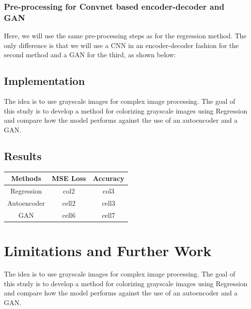 \documentclass{article}
\begin{document}
\subsubsection{Pre-processing for Convnet based encoder-decoder and GAN}
Here, we will use the same pre-processing steps as for the regression method. 
The only difference is that we will use a CNN in an encoder-decoder fashion for the second method and a GAN for the third, as shown below:

\subsection{Implementation}
The idea is to use grayscale images for complex image processing. 
The goal of this study is to develop a method for colorizing grayscale images using Regression and
compare how the model performs against the use of an autoencoder and a GAN. 

\subsection{Results}

{\Large
\begin{center}
\begin{tabular}{ |c |c|c| } 
\hline
\textbf{Methods} & \textbf{MSE Loss} & \textbf{Accuracy} \\
\hline
Regression & col2 & col3 \\
\hline
Autoencoder & cell2 & cell3  \\ 
\hline
GAN & cell6 & cell7  \\ 
\hline
\end{tabular}
\end{center}
}

\section{Limitations and Further Work}
The idea is to use grayscale images for complex image processing. The goal of this
study is to develop a method for colorizing grayscale images using Regression and
compare how the model performs against the use of an autoencoder and a GAN. 
\end{document}
